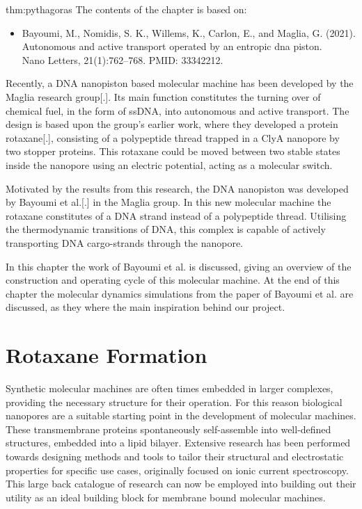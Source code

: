 
\begin{theo}{thm:pythagoras}
  The contents of the chapter is based on:
  \vspace{-0.4cm}
  \begin{itemize}
    \item Bayoumi, M., Nomidis, S. K., Willems, K., Carlon, E., and Maglia, G. (2021).
      Autonomous and active transport operated by an entropic dna piston.\\
      Nano Letters, 21(1):762–768. PMID: 33342212.
  \end{itemize}
  \vspace{0.3cm}
\end{theo}

Recently, a DNA nanopiston based molecular machine has been developed by the Maglia
research group[.].
Its main function constitutes the turning over of chemical fuel, in the form of ssDNA,
into autonomous and active transport. The design is based upon the group's earlier work,
where they developed a protein rotaxane[.], consisting of a polypeptide thread trapped in
a ClyA nanopore by two stopper proteins. This rotaxane could be moved between two stable
states inside the nanopore using an electric potential, acting as a molecular switch.

Motivated by the results from this research, the DNA nanopiston was developed by Bayoumi
et al.[.] in the Maglia group. In this new molecular machine the rotaxane constitutes of
a DNA strand instead of a polypeptide thread. Utilising the thermodynamic transitions of
DNA, this complex is capable of actively transporting DNA cargo-strands through the
nanopore.

In this chapter the work of Bayoumi et al. is discussed, giving an overview of the
construction and operating cycle of this molecular machine.  At the end of this chapter
the molecular dynamics simulations from the paper of Bayoumi et al. are discussed, as
they where the main inspiration behind our project.

\section{Rotaxane Formation}


Synthetic molecular machines are often times embedded in larger complexes, providing the
necessary structure for their operation. For this reason biological nanopores are a
suitable starting point in the development of molecular machines. These transmembrane
proteins spontaneously self-assemble into well-defined structures, embedded into a lipid
bilayer. Extensive research has been performed towards designing methods and tools to
tailor their structural and electrostatic properties for specific use cases, originally
focused on ionic current spectroscopy. This large back catalogue of research can now be
employed into building out their utility as an ideal building block for membrane bound
molecular machines.

